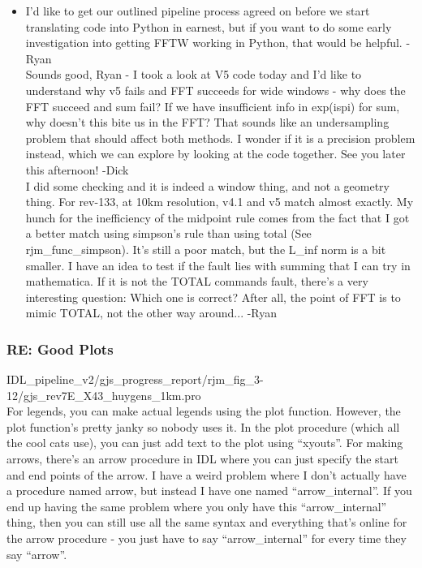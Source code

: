 \documentclass[crop=false,class=book]{standalone}
\begin{document}
\begin{itemize}
    \item I'd like to get our outlined pipeline process agreed on before we start translating code into Python in earnest, but if you want to do some early investigation into getting FFTW working in Python, that would be helpful.
-Ryan\\
Sounds good, Ryan - I took a look at V5 code today and I'd like to understand why v5 fails and FFT succeeds for wide windows - why does the FFT succeed and sum fail? If we have insufficient info in exp(ispi) for sum, why doesn't this bite us in the FFT? That sounds like an undersampling problem that should affect both methods. I wonder if it is a precision problem instead, which we can explore by looking at the code together. See you later this afternoon! -Dick\\
I did some checking and it is indeed a window thing, and not a geometry thing. For rev-133, at 10km resolution, v4.1 and v5 match almost exactly. My hunch for the inefficiency of the midpoint rule comes from the fact that I got a better match using simpson's rule than using total (See rjm\_func\_simpson). It's still a poor match, but the L\_inf norm is a bit smaller. I have an idea to test if the fault lies with summing that I can try in mathematica. If it is not the TOTAL commands fault, there's a very interesting question: Which one is correct? After all, the point of FFT is to mimic TOTAL, not the other way around... -Ryan
\end{itemize}
\subsubsection{\footnotesize RE: Good Plots}
IDL\_pipeline\_v2/gjs\_progress\_report/rjm\_fig\_3-12/gjs\_rev7E\_X43\_huygens\_1km.pro\\
For legends, you can make actual legends using the plot function. However, the plot function’s pretty janky so nobody uses it. In the plot procedure (which all the cool cats use), you can just add text to the plot using “xyouts”. For making arrows, there’s an arrow procedure in IDL where you can just specify the start and end points of the arrow. I have a weird problem where I don’t actually have a procedure named arrow, but instead I have one named “arrow\_internal”. If you end up having the same problem where you only have this “arrow\_internal” thing, then you can still use all the same syntax and everything that’s online for the arrow procedure - you just have to say “arrow\_internal” for every time they say “arrow”.
\end{document}
